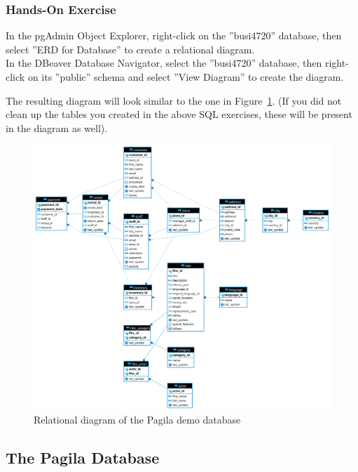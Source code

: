 \begin{tcolorbox}[colback=code]
\subsubsection*{Hands-On Exercise}

In the pgAdmin Object Explorer, right-click on the ''busi4720'' database, then select ''ERD for Database'' to create a relational diagram. \\

In the DBeaver Database Navigator, select the ''busi4720'' database, then right-click on its ''public'' schema and select ''View Diagram'' to create the diagram.
\end{tcolorbox}

\noindent The resulting diagram will look similar to the one in Figure~\ref{fig:pagila}. (If you did not clean up the tables you created in the above SQL exercises, these will be present in the diagram as well).

\begin{figure}
\centering

\includegraphics[width=.95\textwidth]{pagila2dbeaver.png}
\caption{Relational diagram of the Pagila demo database}
\label{fig:pagila}
\end{figure}


\subsection*{The Pagila Database}

